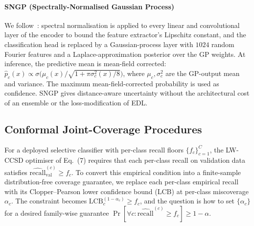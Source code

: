 \documentclass[journal]{IEEEtran}
\begin{document}
\paragraph{SNGP (Spectrally-Normalised Gaussian Process)} We follow~\cite{liu2020sngp}: spectral normalisation is applied to every linear and convolutional layer of the encoder to bound the feature extractor's Lipschitz constant, and the classification head is replaced by a Gaussian-process layer with $1024$ random Fourier features and a Laplace-approximation posterior over the GP weights. At inference, the predictive mean is mean-field corrected: $\hat{p}_c(x) \propto \sigma\big(\mu_c(x) / \sqrt{1 + \pi \sigma^2_c(x) / 8}\big)$, where $\mu_c, \sigma^2_c$ are the GP-output mean and variance. The maximum mean-field-corrected probability is used as confidence. SNGP gives distance-aware uncertainty without the architectural cost of an ensemble or the loss-modification of EDL.

\subsection{Conformal Joint-Coverage Procedures}
\label{sec:conformal_procedures}
For a deployed selective classifier with per-class recall floors $\{f_c\}_{c=1}^C$, the LW-CCSD optimiser of Eq.~(7) requires that each per-class recall on validation data satisfies $\widehat{\mathrm{recall}}^{(c)}_{\text{val}} \geq f_c$. To convert this empirical condition into a finite-sample distribution-free coverage guarantee, we replace each per-class empirical recall with its Clopper--Pearson lower confidence bound (LCB) at per-class miscoverage $\alpha_c$. The constraint becomes $\mathrm{LCB}_c^{(1 - \alpha_c)} \geq f_c$, and the question is how to set $\{\alpha_c\}$ for a desired family-wise guarantee $\Pr[\forall c: \widehat{\mathrm{recall}}^{(c)} \geq f_c] \geq 1 - \alpha$.
\end{document}
